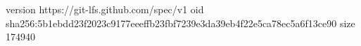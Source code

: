 version https://git-lfs.github.com/spec/v1
oid sha256:5b1ebdd23f2023c9177eeeffb23fbf7239e3da39eb4f22e5ca78ec5a6f13ce90
size 174940
